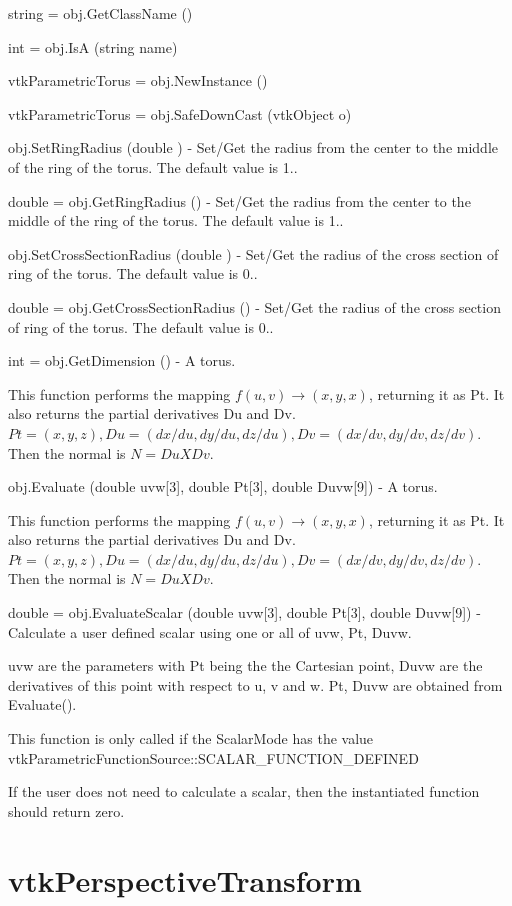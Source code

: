 \begin{DoxyItemize}
\item {\ttfamily string = obj.\-Get\-Class\-Name ()}  
\item {\ttfamily int = obj.\-Is\-A (string name)}  
\item {\ttfamily vtk\-Parametric\-Torus = obj.\-New\-Instance ()}  
\item {\ttfamily vtk\-Parametric\-Torus = obj.\-Safe\-Down\-Cast (vtk\-Object o)}  
\item {\ttfamily obj.\-Set\-Ring\-Radius (double )} -\/ Set/\-Get the radius from the center to the middle of the ring of the torus. The default value is 1..  
\item {\ttfamily double = obj.\-Get\-Ring\-Radius ()} -\/ Set/\-Get the radius from the center to the middle of the ring of the torus. The default value is 1..  
\item {\ttfamily obj.\-Set\-Cross\-Section\-Radius (double )} -\/ Set/\-Get the radius of the cross section of ring of the torus. The default value is 0..  
\item {\ttfamily double = obj.\-Get\-Cross\-Section\-Radius ()} -\/ Set/\-Get the radius of the cross section of ring of the torus. The default value is 0..  
\item {\ttfamily int = obj.\-Get\-Dimension ()} -\/ A torus.

This function performs the mapping $f(u,v) \rightarrow (x,y,x)$, returning it as Pt. It also returns the partial derivatives Du and Dv. $Pt = (x, y, z), Du = (dx/du, dy/du, dz/du), Dv = (dx/dv, dy/dv, dz/dv)$. Then the normal is $N = Du X Dv$.  
\item {\ttfamily obj.\-Evaluate (double uvw\mbox{[}3\mbox{]}, double Pt\mbox{[}3\mbox{]}, double Duvw\mbox{[}9\mbox{]})} -\/ A torus.

This function performs the mapping $f(u,v) \rightarrow (x,y,x)$, returning it as Pt. It also returns the partial derivatives Du and Dv. $Pt = (x, y, z), Du = (dx/du, dy/du, dz/du), Dv = (dx/dv, dy/dv, dz/dv)$. Then the normal is $N = Du X Dv$.  
\item {\ttfamily double = obj.\-Evaluate\-Scalar (double uvw\mbox{[}3\mbox{]}, double Pt\mbox{[}3\mbox{]}, double Duvw\mbox{[}9\mbox{]})} -\/ Calculate a user defined scalar using one or all of uvw, Pt, Duvw.

uvw are the parameters with Pt being the the Cartesian point, Duvw are the derivatives of this point with respect to u, v and w. Pt, Duvw are obtained from Evaluate().

This function is only called if the Scalar\-Mode has the value vtk\-Parametric\-Function\-Source\-::\-S\-C\-A\-L\-A\-R\-\_\-\-F\-U\-N\-C\-T\-I\-O\-N\-\_\-\-D\-E\-F\-I\-N\-E\-D

If the user does not need to calculate a scalar, then the instantiated function should return zero.


\end{DoxyItemize}\hypertarget{vtkcommon_vtkperspectivetransform}{}\section{vtk\-Perspective\-Transform}\label{vtkcommon_vtkperspectivetransform}
